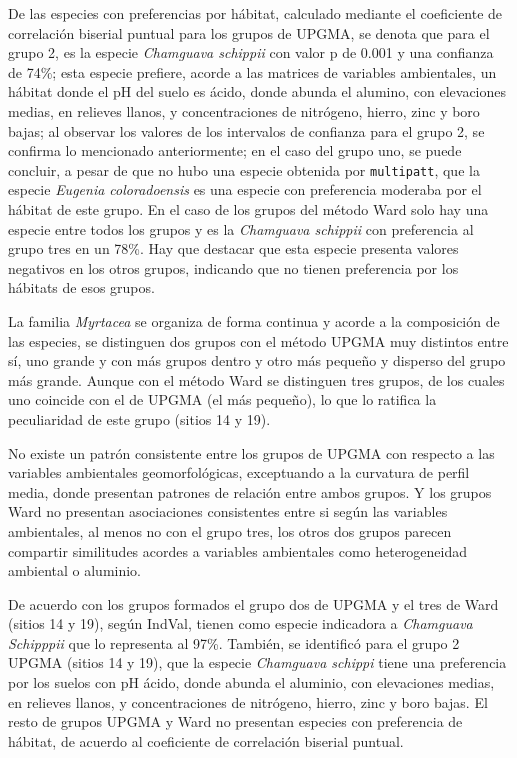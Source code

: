 \documentclass[11pt,]{article}
\begin{document}
De las especies con preferencias por hábitat, calculado mediante el
coeficiente de correlación biserial puntual para los grupos de UPGMA, se
denota que para el grupo 2, es la especie \emph{Chamguava schippii} con
valor p de 0.001 y una confianza de 74\%; esta especie prefiere, acorde
a las matrices de variables ambientales, un hábitat donde el pH del
suelo es ácido, donde abunda el alumino, con elevaciones medias, en
relieves llanos, y concentraciones de nitrógeno, hierro, zinc y boro
bajas; al observar los valores de los intervalos de confianza para el
grupo 2, se confirma lo mencionado anteriormente; en el caso del grupo
uno, se puede concluir, a pesar de que no hubo una especie obtenida por
\texttt{multipatt}, que la especie \emph{Eugenia coloradoensis} es una
especie con preferencia moderaba por el hábitat de este grupo. En el
caso de los grupos del método Ward solo hay una especie entre todos los
grupos y es la \emph{Chamguava schippii} con preferencia al grupo tres
en un 78\%. Hay que destacar que esta especie presenta valores negativos
en los otros grupos, indicando que no tienen preferencia por los
hábitats de esos grupos.

La familia \emph{Myrtacea} se organiza de forma continua y acorde a la
composición de las especies, se distinguen dos grupos con el método
UPGMA muy distintos entre sí, uno grande y con más grupos dentro y otro
más pequeño y disperso del grupo más grande. Aunque con el método Ward
se distinguen tres grupos, de los cuales uno coincide con el de UPGMA
(el más pequeño), lo que lo ratifica la peculiaridad de este grupo
(sitios 14 y 19).

No existe un patrón consistente entre los grupos de UPGMA con respecto a
las variables ambientales geomorfológicas, exceptuando a la curvatura de
perfil media, donde presentan patrones de relación entre ambos grupos. Y
los grupos Ward no presentan asociaciones consistentes entre si según
las variables ambientales, al menos no con el grupo tres, los otros dos
grupos parecen compartir similitudes acordes a variables ambientales
como heterogeneidad ambiental o aluminio.

De acuerdo con los grupos formados el grupo dos de UPGMA y el tres de
Ward (sitios 14 y 19), según IndVal, tienen como especie indicadora a
\emph{Chamguava Schipppii} que lo representa al 97\%. También, se
identificó para el grupo 2 UPGMA (sitios 14 y 19), que la especie
\emph{Chamguava schippi} tiene una preferencia por los suelos con pH
ácido, donde abunda el aluminio, con elevaciones medias, en relieves
llanos, y concentraciones de nitrógeno, hierro, zinc y boro bajas. El
resto de grupos UPGMA y Ward no presentan especies con preferencia de
hábitat, de acuerdo al coeficiente de correlación biserial puntual.
\end{document}
